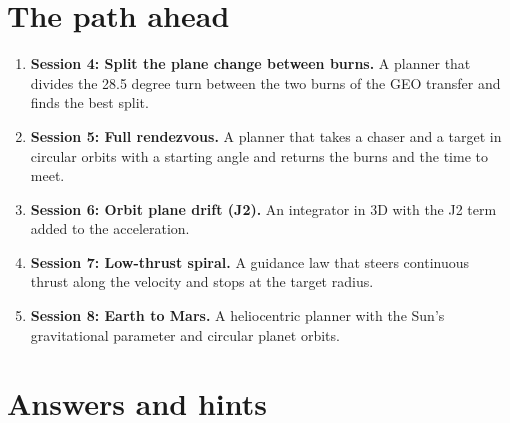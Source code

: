 \documentclass[11pt,a4paper]{article}
\begin{document}
\section{The path ahead}
\begin{enumerate}[nosep]
\item \textbf{Session 4: Split the plane change between burns.} A planner that divides the 28.5 degree turn between the two burns of the GEO transfer and finds the best split.
\item \textbf{Session 5: Full rendezvous.} A planner that takes a chaser and a target in circular orbits with a starting angle and returns the burns and the time to meet.
\item \textbf{Session 6: Orbit plane drift (J2).} An integrator in 3D with the J2 term added to the acceleration.
\item \textbf{Session 7: Low-thrust spiral.} A guidance law that steers continuous thrust along the velocity and stops at the target radius.
\item \textbf{Session 8: Earth to Mars.} A heliocentric planner with the Sun's gravitational parameter and circular planet orbits.
\end{enumerate}

\section{Answers and hints}
\end{document}
